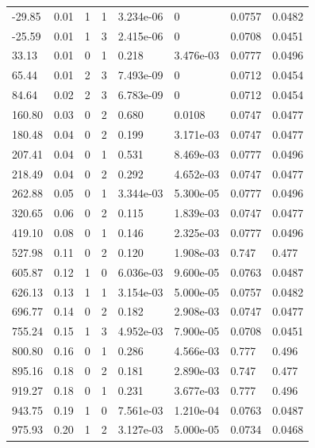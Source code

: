 \documentclass[preview]{standalone}
\begin{document}
{{\begin{tabular}{L{1.2cm}C{1.2cm} C{0.3cm}C{0.5cm} C{1.4cm}C{1.4cm} C{1.4cm}C{1.4cm}}
  -29.85  &  0.01  & 1     &  1 &  3.234e-06  & 0  & 0.0757 &  0.0482   \\ 
  -25.59  &  0.01  & 1     &  3 &  2.415e-06  & 0  & 0.0708 &  0.0451   \\ 
  33.13  &  0.01  & 0     &  1 &  0.218  & 3.476e-03  & 0.0777 &  0.0496   \\ 
  65.44  &  0.01  & 2     &  3 &  7.493e-09  & 0  & 0.0712 &  0.0454   \\ 
  84.64  &  0.02  & 2     &  3 &  6.783e-09  & 0  & 0.0712 &  0.0454   \\ 
  160.80  &  0.03  & 0     &  2 &  0.680  & 0.0108  & 0.0747 &  0.0477   \\ 
  180.48  &  0.04  & 0     &  2 &  0.199  & 3.171e-03  & 0.0747 &  0.0477   \\ 
  207.41  &  0.04  & 0     &  1 &  0.531  & 8.469e-03  & 0.0777 &  0.0496   \\ 
  218.49  &  0.04  & 0     &  2 &  0.292  & 4.652e-03  & 0.0747 &  0.0477   \\ 
  262.88  &  0.05  & 0     &  1 &  3.344e-03  & 5.300e-05  & 0.0777 &  0.0496   \\ 
  320.65  &  0.06  & 0     &  2 &  0.115  & 1.839e-03  & 0.0747 &  0.0477   \\ 
  419.10  &  0.08  & 0     &  1 &  0.146  & 2.325e-03  & 0.0777 &  0.0496   \\ 
  527.98  &  0.11  & 0     &  2 &  0.120  & 1.908e-03  & 0.747 &  0.477   \\ 
  605.87  &  0.12  & 1     &  0 &  6.036e-03  & 9.600e-05  & 0.0763 &  0.0487   \\ 
  626.13  &  0.13  & 1     &  1 &  3.154e-03  & 5.000e-05  & 0.0757 &  0.0482   \\ 
  696.77  &  0.14  & 0     &  2 &  0.182  & 2.908e-03  & 0.0747 &  0.0477   \\ 
  755.24  &  0.15  & 1     &  3 &  4.952e-03  & 7.900e-05  & 0.0708 &  0.0451   \\ 
  800.80  &  0.16  & 0     &  1 &  0.286  & 4.566e-03  & 0.777 &  0.496   \\ 
  895.16  &  0.18  & 0     &  2 &  0.181  & 2.890e-03  & 0.747 &  0.477   \\ 
  919.27  &  0.18  & 0     &  1 &  0.231  & 3.677e-03  & 0.777 &  0.496   \\ 
  943.75  &  0.19  & 1     &  0 &  7.561e-03  & 1.210e-04  & 0.0763 &  0.0487   \\ 
  975.93  &  0.20  & 1     &  2 &  3.127e-03  & 5.000e-05  & 0.0734 &  0.0468   \\ 

\end{tabular}}}
\end{document}
